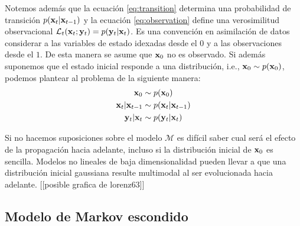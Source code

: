 Notemos además que la ecuación \ref{eq:transition} determina una probabilidad de transición $p(\mathbf{x}_t | \mathbf{x}_{t-1})$ y la ecuación \ref{eq:observation} define una verosimilitud observacional $\mathcal{L}_t(\mathbf{x}_t ; \mathbf{y}_t) = p(\mathbf{y}_t | \mathbf{x}_t)$. Es una convención en asimilación de datos considerar a las variables de estado idexadas desde el $0$ y a las observaciones desde el $1$. De esta manera se asume que $\mathbf{x}_0$ no es observado. Si además suponemos que el estado inicial responde a una distribución, i.e.,  $\mathbf{x}_0 \sim p(\mathbf{x}_0)$, podemos plantear al problema de la siguiente manera:
\begin{align}
    \mathbf{x}_0 &\sim p(\mathbf{x}_0) \\
    \mathbf{x}_t | \mathbf{x}_{t-1} &\sim p(\mathbf{x}_t | \mathbf{x}_{t-1}) \\
    \mathbf{y}_t | \mathbf{x}_t &\sim p(\mathbf{y}_t | \mathbf{x}_t)
\end{align}

Si no hacemos suposiciones sobre el modelo $\mathcal{M}$ es difícil saber cual será el efecto de la propagación hacia adelante, incluso si la distribución inicial de $\mathbf{x}_0$ es sencilla. Modelos no lineales de baja dimensionalidad pueden llevar a que una distribución inicial gaussiana resulte multimodal al ser evolucionada hacia adelante. 
[[posible grafica de lorenz63]]

\subsection{Modelo de Markov escondido}

